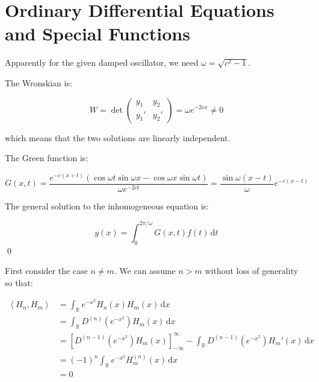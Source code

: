 \documentclass[12pt]{article}
\begin{document}



\pagebreak
\section*{Ordinary Differential Equations and Special Functions}



Apparently for the given damped oscillator, we need $\omega = \sqrt{c^{2} - 1}$.

The Wronskian is:

\begin{equation}
    W = 
    \det \begin{pmatrix}
        y_{1} & y_{2} \\
        y_{1}' & y_{2}'
    \end{pmatrix} = \omega e^{-2cx} \ne 0
\end{equation}

which means that the two solutions are linearly independent.

The Green function is:

\begin{equation}
    G(x, t) = \frac{e^{-c(x + t)}(\cos{\omega t}\sin{\omega x} - \cos{\omega x}\sin{\omega t})}{\omega e^{-2ct}} = \frac{\sin{\omega(x - t)}}{\omega} e^{-c(x - t)}
\end{equation}

The general solution to the inhomogeneous equation is:

\begin{equation}
    y(x) = \int_{0}^{2\pi/\omega} G(x, t) f(t) \, \mathrm{d}t
\end{equation}
\qed



First consider the case $n \ne m$. We can assume $n > m$ without loss of generality so that:

\begin{equation}
\begin{split}
    \left\langle H_{n}, H_{m} \right\rangle &= \int_{\mathbb{R}} e^{-x^{2}} H_{n}(x) H_{m}(x) \, \mathrm{d}x \\
    &= \int_{\mathbb{R}} D^{(n)} \left( e^{-x^{2}} \right) H_{m}(x) \, \mathrm{d}x \\
    &= \left[ D^{(n - 1)} \left( e^{-x^{2}} \right) H_{m}(x) \right]_{-\infty}^{\infty} - \int_{\mathbb{R}} D^{(n - 1)} \left( e^{-x^{2}} \right) H_{m}'(x) \, \mathrm{d}x \\
    &= (-1)^{n} \int_{\mathbb{R}} e^{-x^{2}} H_{m}^{(n)}(x) \, \mathrm{d}x \\
    &= 0
\end{split}
\end{equation}
\end{document}
